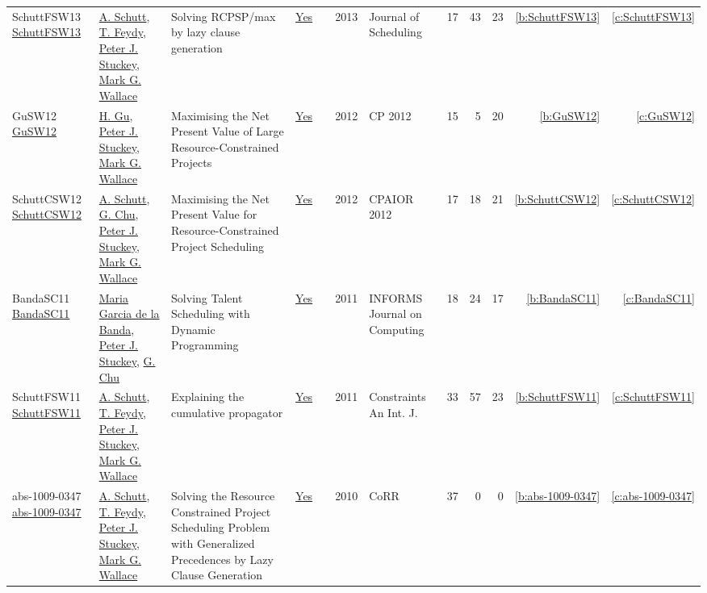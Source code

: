 {\begin{longtable}{>{\raggedright\arraybackslash}p{3cm}>{\raggedright\arraybackslash}p{6cm}>{\raggedright\arraybackslash}p{6.5cm}rrrp{2.5cm}rrrrr}
SchuttFSW13 \href{https://doi.org/10.1007/s10951-012-0285-x}{SchuttFSW13} & \hyperref[auth:a125]{A. Schutt}, \hyperref[auth:a155]{T. Feydy}, \hyperref[auth:a126]{Peter J. Stuckey}, \hyperref[auth:a156]{Mark G. Wallace} & Solving RCPSP/max by lazy clause generation & \href{works/SchuttFSW13.pdf}{Yes} & \cite{SchuttFSW13} & 2013 & Journal of Scheduling & 17 & 43 & 23 & \ref{b:SchuttFSW13} & \ref{c:SchuttFSW13}\\
GuSW12 \href{https://doi.org/10.1007/978-3-642-33558-7\_55}{GuSW12} & \hyperref[auth:a342]{H. Gu}, \hyperref[auth:a126]{Peter J. Stuckey}, \hyperref[auth:a156]{Mark G. Wallace} & Maximising the Net Present Value of Large Resource-Constrained Projects & \href{works/GuSW12.pdf}{Yes} & \cite{GuSW12} & 2012 & CP 2012 & 15 & 5 & 20 & \ref{b:GuSW12} & \ref{c:GuSW12}\\
SchuttCSW12 \href{https://doi.org/10.1007/978-3-642-29828-8\_24}{SchuttCSW12} & \hyperref[auth:a125]{A. Schutt}, \hyperref[auth:a349]{G. Chu}, \hyperref[auth:a126]{Peter J. Stuckey}, \hyperref[auth:a156]{Mark G. Wallace} & Maximising the Net Present Value for Resource-Constrained Project Scheduling & \href{works/SchuttCSW12.pdf}{Yes} & \cite{SchuttCSW12} & 2012 & CPAIOR 2012 & 17 & 18 & 21 & \ref{b:SchuttCSW12} & \ref{c:SchuttCSW12}\\
BandaSC11 \href{https://doi.org/10.1287/ijoc.1090.0378}{BandaSC11} & \hyperref[auth:a808]{Maria Garcia de la Banda}, \hyperref[auth:a126]{Peter J. Stuckey}, \hyperref[auth:a349]{G. Chu} & Solving Talent Scheduling with Dynamic Programming & \href{works/BandaSC11.pdf}{Yes} & \cite{BandaSC11} & 2011 & INFORMS Journal on Computing & 18 & 24 & 17 & \ref{b:BandaSC11} & \ref{c:BandaSC11}\\
SchuttFSW11 \href{https://doi.org/10.1007/s10601-010-9103-2}{SchuttFSW11} & \hyperref[auth:a125]{A. Schutt}, \hyperref[auth:a155]{T. Feydy}, \hyperref[auth:a126]{Peter J. Stuckey}, \hyperref[auth:a156]{Mark G. Wallace} & Explaining the cumulative propagator & \href{works/SchuttFSW11.pdf}{Yes} & \cite{SchuttFSW11} & 2011 & Constraints An Int. J. & 33 & 57 & 23 & \ref{b:SchuttFSW11} & \ref{c:SchuttFSW11}\\
abs-1009-0347 \href{http://arxiv.org/abs/1009.0347}{abs-1009-0347} & \hyperref[auth:a125]{A. Schutt}, \hyperref[auth:a155]{T. Feydy}, \hyperref[auth:a126]{Peter J. Stuckey}, \hyperref[auth:a156]{Mark G. Wallace} & Solving the Resource Constrained Project Scheduling Problem with Generalized Precedences by Lazy Clause Generation & \href{works/abs-1009-0347.pdf}{Yes} & \cite{abs-1009-0347} & 2010 & CoRR & 37 & 0 & 0 & \ref{b:abs-1009-0347} & \ref{c:abs-1009-0347}\\

\end{longtable}}
